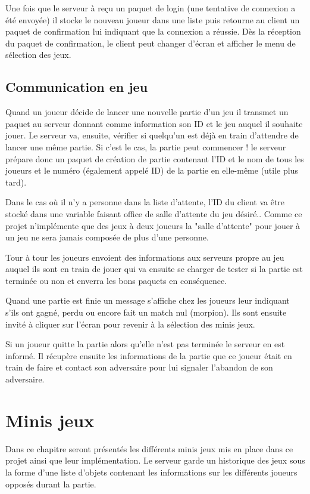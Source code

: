 \documentclass{report}
\begin{document}
Une fois que le serveur à reçu un paquet de login (une tentative de connexion a
été envoyée) il stocke le nouveau joueur dans une liste puis retourne au client un paquet de confirmation lui indiquant que la connexion a réussie. Dès la réception du paquet de confirmation, le client peut changer d'écran et afficher le menu de sélection des jeux.

\section{Communication en jeu}

Quand un joueur décide de lancer une nouvelle partie d'un jeu il transmet un paquet au serveur donnant comme information son ID et le jeu
auquel il souhaite jouer. Le serveur va, ensuite, vérifier si quelqu'un est déjà en train d'attendre de lancer une même partie. Si c'est le cas, la partie peut commencer ! le serveur prépare donc un paquet de création de partie contenant l'ID et le nom de tous les
joueurs et le numéro (également appelé ID) de la partie en elle-même (utile plus tard). \par
Dans le cas où il n'y a personne dans la liste d'attente, l'ID du client va être stocké dans une variable faisant office de salle d'attente du jeu désiré.. Comme ce projet n'implémente que des jeux à deux joueurs la "salle d'attente" pour jouer à un jeu ne sera jamais composée de plus d'une personne.\par
Tour à tour les joueurs envoient des informations aux serveurs propre au jeu auquel ils sont en train de jouer qui va ensuite se charger de
tester si la partie est terminée ou non et enverra les bons paquets en conséquence.

Quand une partie est finie un message s'affiche chez les joueurs leur indiquant s'ils ont gagné, perdu ou encore fait un match nul (morpion). Ils sont
ensuite invité à cliquer sur l'écran pour revenir à la sélection des minis jeux.

Si un joueur quitte la partie alors qu'elle n'est pas terminée le serveur en est informé. Il récupère ensuite les informations de la partie que
ce joueur était en train de faire et contact son adversaire pour lui signaler l'abandon de son adversaire.

\chapter{Minis jeux}
Dans ce chapitre seront présentés les différents minis jeux mis en place dans
ce projet ainsi que leur implémentation.
Le serveur garde un historique des jeux sous la forme d'une liste d'objets
contenant les informations sur les différents joueurs opposés durant la partie.
\end{document}
